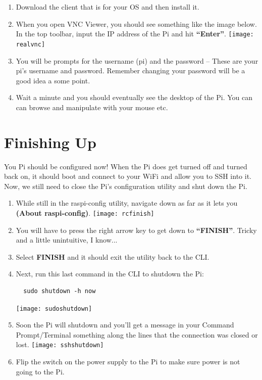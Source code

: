 \documentclass{article}
\begin{document}
\begin{enumerate}
  \item Download the client that is for your OS and then install it.  
  \item When you open VNC Viewer, you should see something like the image below. In the top toolbar, input the IP address of the Pi and hit \textbf{``Enter''}.
  \texttt{[image: realvnc]}
  \item You will be prompts for the username (pi) and the password -- These are your pi's username and password. Remember changing your password will be a good idea a some point.
  \item Wait a minute and you should eventually see the desktop of the Pi. You can can browse and manipulate with your mouse etc.
\end{enumerate}

\section{Finishing Up}

You Pi should be configured now! When the Pi does get turned off and turned back on, it should boot and connect to your WiFi and allow you to SSH into it. Now, we still need to close the Pi's configuration utility and shut down the Pi.

\begin{enumerate}
  \item While still in the raspi-config utility, navigate down as far as it lets you \textbf{(About raspi-config)}.
  \newline
  \newline
  \texttt{[image: rcfinish]}
  \item You will have to press the right arrow key to get down to \textbf{``FINISH''}. Tricky and a little unintuitive, I know...
  \item Select \textbf{FINISH} and it should exit the utility back to the CLI.
  \item Next, run this last command in the CLI to shutdown the Pi:
  \begin{lstlisting}
  sudo shutdown -h now
  \end{lstlisting}
  \texttt{[image: sudoshutdown]}
  \item Soon the Pi will shutdown and you'll get a message in your Command Prompt/Terminal something along the lines that the connection was closed or lost. 
  \newline
  \newline
  \texttt{[image: sshshutdown]}
  \item Flip the switch on the power supply to the Pi to make sure power is not going to the Pi.
\end{enumerate}
\end{document}
